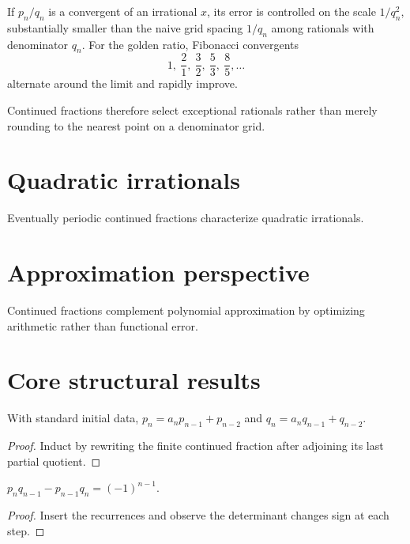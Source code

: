\begin{example}\label{ex:ii25-expand-03}
If \(p_n/q_n\) is a convergent of an irrational \(x\), its error is controlled
on the scale \(1/q_n^2\), substantially smaller than the naive grid spacing
\(1/q_n\) among rationals with denominator \(q_n\). For the golden ratio,
Fibonacci convergents
\[
1,\ \frac21,\ \frac32,\ \frac53,\ \frac85,\ldots
\]
alternate around the limit and rapidly improve.

Continued fractions therefore select exceptional rationals rather than merely
rounding to the nearest point on a denominator grid.
\end{example}
\section{Quadratic irrationals}
Eventually periodic continued fractions characterize quadratic irrationals.

\section{Approximation perspective}
Continued fractions complement polynomial approximation by optimizing arithmetic rather than functional error.

\section{Core structural results}

\begin{theorem}\label{thm:ii25-01}
With standard initial data, $p_n=a_np_{n-1}+p_{n-2}$ and $q_n=a_nq_{n-1}+q_{n-2}$.
\begin{proof}
Induct by rewriting the finite continued fraction after adjoining its last partial quotient.
\end{proof}
\end{theorem}

\begin{theorem}\label{thm:ii25-02}
$p_nq_{n-1}-p_{n-1}q_n=(-1)^{n-1}$.
\begin{proof}
Insert the recurrences and observe the determinant changes sign at each step.
\end{proof}
\end{theorem}

